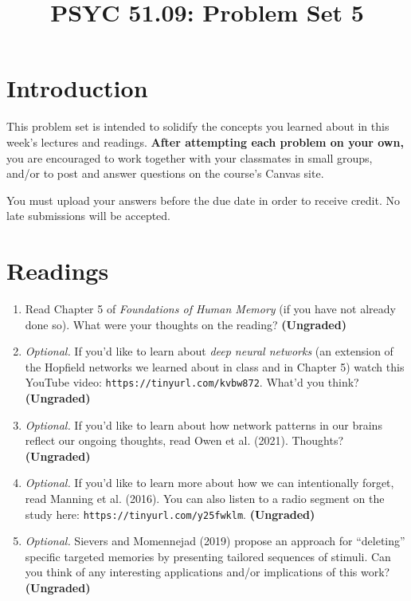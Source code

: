 \documentclass[11pt]{article}
\title{PSYC 51.09: Problem Set 5}
\date{}
\begin{document}
\maketitle
\vspace{-0.75in}
\section*{Introduction}
This problem set is intended to solidify the concepts you learned
about in this week's lectures and readings.  \textbf{After attempting each problem
  on your own,} you are encouraged to work together with your classmates in small groups, and/or to post and answer questions on the course’s Canvas site.

You must upload your answers before the due date in order to receive credit.  No late submissions will be accepted.

\section*{Readings}
\begin{enumerate}
\item Read Chapter 5 of \textit{Foundations of Human Memory} (if you
  have not already done so).  What were your thoughts on the reading?
  \textbf{(Ungraded)}

\item \textit{Optional.}  If you'd like to learn about \textit{deep neural networks} (an
  extension of the Hopfield networks we learned about in class and in
  Chapter 5) watch this YouTube video:
  \texttt{https://tinyurl.com/kvbw872}.  What'd you think?
  \textbf{(Ungraded)}

\item \textit{Optional.} If you'd like to learn about how network
  patterns in our brains reflect our ongoing thoughts, read Owen et
  al. (2021).  Thoughts?  \textbf{(Ungraded)}

\item \textit{Optional.} If you'd like to learn more about how we can
  intentionally forget, read Manning et al. (2016).  You can also
  listen to a radio segment on the study here:
  \texttt{https://tinyurl.com/y25fwklm}. \textbf{(Ungraded)}

  \item \textit{Optional.} Sievers and Momennejad (2019) propose an
    approach for ``deleting'' specific targeted  memories by
    presenting tailored sequences of stimuli.  Can you think of any
    interesting applications and/or implications of this work?  \textbf{(Ungraded)}
\end{enumerate}
\end{document}
